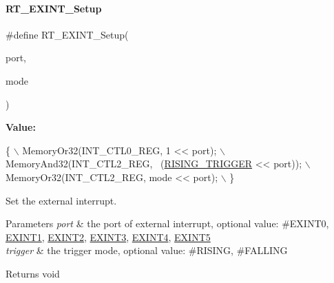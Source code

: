 \paragraph{\texorpdfstring{R\+T\+\_\+\+E\+X\+I\+N\+T\+\_\+\+Setup}{RT\_EXINT\_Setup}}
{\footnotesize\ttfamily \#define R\+T\+\_\+\+E\+X\+I\+N\+T\+\_\+\+Setup(\begin{DoxyParamCaption}\item[{}]{port,  }\item[{}]{mode }\end{DoxyParamCaption})}

{\bfseries Value\+:}
\begin{DoxyCode}
\{                                                \(\backslash\)
        MemoryOr32(INT\_CTL0\_REG, 1 << port);         \(\backslash\)
        MemoryAnd32(INT\_CTL2\_REG, ~(\mbox{\hyperlink{a00020_a6d33f21be3f0c5cf91c5d638e8aca086a60a109ab1ab372f4e3935064a3f0a26c}{RISING\_TRIGGER}} << port)); \(\backslash\)
        MemoryOr32(INT\_CTL2\_REG, mode << port);   \(\backslash\)
    \}
\end{DoxyCode}


Set the external interrupt. 


\begin{DoxyParams}{Parameters}
{\em port} & the port of external interrupt, optional value\+: \#\+E\+X\+I\+N\+T0, \mbox{\hyperlink{a00011_af11f5754cc92430795a63bb53d964cd4a6c87103fd7c63fc99ee4b631c0a4dac4}{E\+X\+I\+N\+T1}}, \mbox{\hyperlink{a00011_af11f5754cc92430795a63bb53d964cd4a92c5398067978d1aefd4ba3c276dec32}{E\+X\+I\+N\+T2}}, \mbox{\hyperlink{a00011_af11f5754cc92430795a63bb53d964cd4a3c37ddaa34bf4297b421d8577be06895}{E\+X\+I\+N\+T3}}, \mbox{\hyperlink{a00011_af11f5754cc92430795a63bb53d964cd4a766aca243fc0f7aa292c791202bef6e7}{E\+X\+I\+N\+T4}}, \mbox{\hyperlink{a00011_af11f5754cc92430795a63bb53d964cd4af59c814bf9818345f24bb79e7533945c}{E\+X\+I\+N\+T5}} \\
\hline
{\em trigger} & the trigger mode, optional value\+: \#\+R\+I\+S\+I\+NG, \#\+F\+A\+L\+L\+I\+NG \\
\hline
\end{DoxyParams}
\begin{DoxyReturn}{Returns}
void 
\end{DoxyReturn}
\mbox{\label{a00011_a397366295a7d6d3ed47e5e3d69549448}} 

